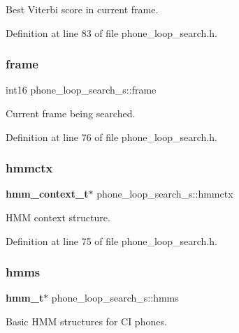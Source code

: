 Best Viterbi score in current frame. 



Definition at line 83 of file phone\+\_\+loop\+\_\+search.\+h.

\mbox{\label{structphone__loop__search__s_a160e5fb9670d1870e5b21379a87bace5}} 
\subsubsection{frame}
{\footnotesize\ttfamily int16 phone\+\_\+loop\+\_\+search\+\_\+s\+::frame}



Current frame being searched. 



Definition at line 76 of file phone\+\_\+loop\+\_\+search.\+h.

\mbox{\label{structphone__loop__search__s_a67c44a95de79cb421fbeed4432686f48}} 
\subsubsection{hmmctx}
{\footnotesize\ttfamily \textbf{ hmm\+\_\+context\+\_\+t}$\ast$ phone\+\_\+loop\+\_\+search\+\_\+s\+::hmmctx}



H\+MM context structure. 



Definition at line 75 of file phone\+\_\+loop\+\_\+search.\+h.

\mbox{\label{structphone__loop__search__s_a6f29f6a259a1ee07108bb55036cec9d0}} 
\subsubsection{hmms}
{\footnotesize\ttfamily \textbf{ hmm\+\_\+t}$\ast$ phone\+\_\+loop\+\_\+search\+\_\+s\+::hmms}



Basic H\+MM structures for CI phones. 



